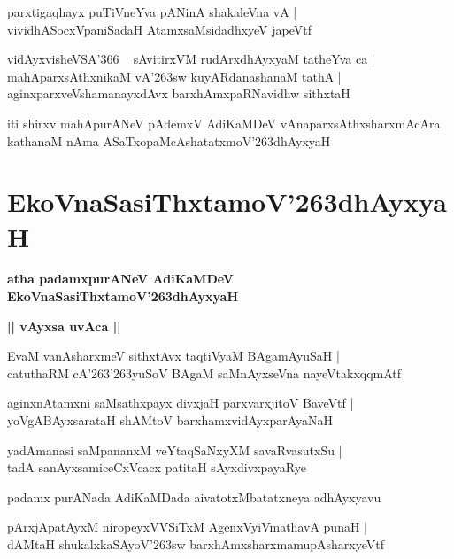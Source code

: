\documentclass[twoside,12pt,openright]{book}
\def\S{\char'263}
\newcounter{shloka}[chapter]
\def\uvaca#1{\centerline{{\large\textbf{#1}}}}
\begin{document}
\begin{shloka}
parxtigaqhayx puTiVneYva pANinA shakaleVna vA |\\
vividhASocxVpaniSadaH AtamxsaMsidadhxyeV japeVtf 
\end{shloka}

\begin{shloka}
vidAyxvisheVSA\char'366 ~ sAvitirxVM rudArxdhAyxyaM tatheYva ca |\\
mahAparxsAthxnikaM vA\S sw kuyARdanashanaM tathA |\\
aginxparxveVshamanayxdAvx barxhAmxpaRNavidhw sithxtaH 
\end{shloka}

\begin{center}
iti shirxv mahApurANeV pAdemxV AdiKaMDeV vAnaparxsAthxsharxmAcAra kathanaM nAma ASaTxopaMcAshatatxmoV\S dhAyxyaH 
\end{center}

\chapter{EkoVnaSasiThxtamoV\S dhAyxyaH}

\begin{center}
{\LARGE\bfseries atha padamxpurANeV AdiKaMDeV EkoVnaSasiThxtamoV\S dhAyxyaH}
\end{center}

\uvaca{|| vAyxsa uvAca ||}

\begin{shloka}
EvaM vanAsharxmeV sithxtAvx taqtiVyaM BAgamAyuSaH |\\
catuthaRM cA\S\S yuSoV BAgaM saMnAyxseVna nayeVtakxqqmAtf 
\end{shloka}

\begin{shloka}
aginxnAtamxni saMsathxpayx divxjaH parxvarxjitoV BaveVtf |\\
yoVgABAyxsarataH shAMtoV barxhamxvidAyxparAyaNaH 
\end{shloka}

\begin{shloka}
yadAmanasi saMpananxM veYtaqSaNxyXM savaRvasutxSu |\\
tadA sanAyxsamiceCxVcacx patitaH sAyxdivxpayaRye
\end{shloka}

\begin{center}
padamx purANada AdiKaMDada aivatotxMbatatxneya adhAyxyavu
\end{center}

\begin{shloka}
pArxjApatAyxM niropeyxVVSiTxM AgenxVyiVmathavA punaH |\\
dAMtaH shukalxkaSAyoV\S sw barxhAmxsharxmamupAsharxyeVtf 
\end{shloka}
\end{document}
